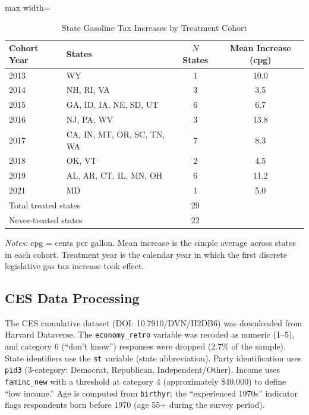 \documentclass[12pt]{article}
\begin{document}
\begin{table}[H]
\centering
\caption{State Gasoline Tax Increases by Treatment Cohort}
\label{tab:treatment_cohorts}
\begin{threeparttable}
\begin{adjustbox}{max width=\textwidth}
\begin{tabular}{llcc}
\toprule
Cohort Year & States & $N$ States & Mean Increase (cpg) \\
\midrule
2013 & WY & 1 & 10.0 \\
2014 & NH, RI, VA & 3 & 3.5 \\
2015 & GA, ID, IA, NE, SD, UT & 6 & 6.7 \\
2016 & NJ, PA, WV & 3 & 13.8 \\
2017 & CA, IN, MT, OR, SC, TN, WA & 7 & 8.3 \\
2018 & OK, VT & 2 & 4.5 \\
2019 & AL, AR, CT, IL, MN, OH & 6 & 11.2 \\
2021 & MD & 1 & 5.0 \\
\midrule
\multicolumn{2}{l}{Total treated states} & 29 & \\
\multicolumn{2}{l}{Never-treated states} & 22 & \\
\bottomrule
\end{tabular}
\end{adjustbox}
\begin{tablenotes}[flushleft]
\small
\item \textit{Notes:} cpg = cents per gallon. Mean increase is the simple average across states in each cohort. Treatment year is the calendar year in which the first discrete legislative gas tax increase took effect.
\end{tablenotes}
\end{threeparttable}
\end{table}

\subsection{CES Data Processing}

The CES cumulative dataset (DOI: 10.7910/DVN/II2DB6) was downloaded from Harvard Dataverse. The \texttt{economy\_retro} variable was recoded as numeric (1--5), and category 6 (``don't know'') responses were dropped (2.7\% of the sample). State identifiers use the \texttt{st} variable (state abbreviation). Party identification uses \texttt{pid3} (3-category: Democrat, Republican, Independent/Other). Income uses \texttt{faminc\_new} with a threshold at category 4 (approximately \$40,000) to define ``low income.'' Age is computed from \texttt{birthyr}; the ``experienced 1970s'' indicator flags respondents born before 1970 (age 55+ during the survey period).
\end{document}
